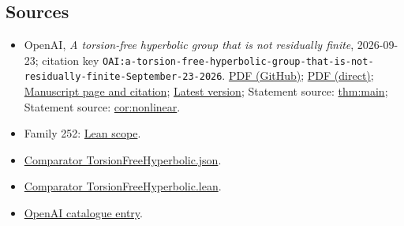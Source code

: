 \documentclass[11pt]{article}
\begin{document}
\subsection{Sources}
\begin{itemize}
\item OpenAI, \emph{A torsion-free hyperbolic group that is not residually finite}, 2026-09-23; citation key \texttt{OAI:a-torsion-free-hyperbolic-group-that-is-not-residually-finite-September-23-2026}. \href{https://github.com/openai/math/blob/adc7f1241b42e322a6451854ab7e4b4c146bf78a/preprints/a-torsion-free-hyperbolic-group-that-is-not-residually-finite-September-23-2026/paper.pdf}{PDF (GitHub)}; \href{https://github.com/openai/math/raw/adc7f1241b42e322a6451854ab7e4b4c146bf78a/preprints/a-torsion-free-hyperbolic-group-that-is-not-residually-finite-September-23-2026/paper.pdf}{PDF (direct)}; \href{https://github.com/openai/math/blob/adc7f1241b42e322a6451854ab7e4b4c146bf78a/preprints/a-torsion-free-hyperbolic-group-that-is-not-residually-finite-September-23-2026/README.md}{Manuscript page and citation}; \href{https://github.com/openai/math/blob/main/preprints/a-torsion-free-hyperbolic-group-that-is-not-residually-finite-September-23-2026/paper.pdf}{Latest version}; Statement source: \href{https://github.com/openai/math/blob/adc7f1241b42e322a6451854ab7e4b4c146bf78a/preprints/a-torsion-free-hyperbolic-group-that-is-not-residually-finite-September-23-2026/build/paper.tex\#L58}{thm:main}; Statement source: \href{https://github.com/openai/math/blob/adc7f1241b42e322a6451854ab7e4b4c146bf78a/preprints/a-torsion-free-hyperbolic-group-that-is-not-residually-finite-September-23-2026/build/paper.tex\#L66}{cor:nonlinear}.
\item Family 252: \href{https://github.com/openai/math/blob/adc7f1241b42e322a6451854ab7e4b4c146bf78a/lean/docs/252.md}{Lean scope}.
\item \href{https://github.com/openai/math/blob/adc7f1241b42e322a6451854ab7e4b4c146bf78a/lean/ComparatorChallenges/TorsionFreeHyperbolic.json}{Comparator TorsionFreeHyperbolic.json}.
\item \href{https://github.com/openai/math/blob/adc7f1241b42e322a6451854ab7e4b4c146bf78a/lean/ComparatorChallenges/TorsionFreeHyperbolic.lean}{Comparator TorsionFreeHyperbolic.lean}.
\item \href{https://github.com/openai/math/blob/adc7f1241b42e322a6451854ab7e4b4c146bf78a/CONTENTS.md}{OpenAI catalogue entry}.
\end{itemize}
\end{document}

